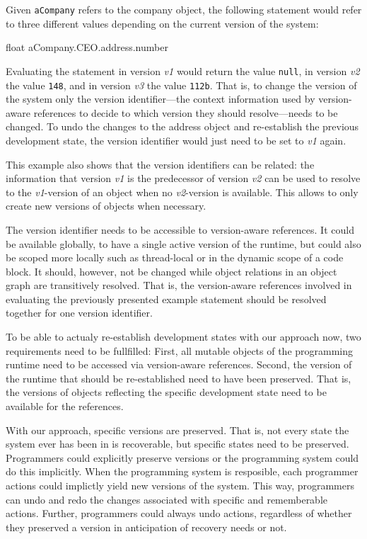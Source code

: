 Given \lstinline{aCompany} refers to the company object, the following statement would refer to three different values depending on the current version of the system:

\begin{code}{}{float}
aCompany.CEO.address.number
\end{code}
\iffalse
\end{verbatim}\fi

Evaluating the statement in version \emph{v1} would return the value \lstinline{null}, in version \emph{v2} the value \lstinline{148}, and in version \emph{v3} the value \lstinline{112b}.
That is, to change the version of the system only the version identifier---the context information used by version-aware references to decide to which version they should resolve---needs to be changed.
To undo the changes to the address object and re-establish the previous development state, the version identifier would just need to be set to \emph{v1} again.

This example also shows that the version identifiers can be related: the information that version \emph{v1} is the predecessor of version \emph{v2} can be used to resolve to the \emph{v1}-version of an object when no \emph{v2}-version is available.
This allows to only create new versions of objects when necessary.

The version identifier needs to be accessible to version-aware references.
It could be available globally, to have a single active version of the runtime, but could also be scoped more locally such as thread-local or in the dynamic scope of a code block.
It should, however, not be changed while object relations in an object graph are transitively resolved.
That is, the version-aware references involved in evaluating the previously presented example statement should be resolved together for one version identifier.

To be able to actualy re-establish development states with our approach now, two requirements need to be fullfilled:
First, all mutable objects of the programming runtime need to be accessed via version-aware references.
Second, the version of the runtime that should be re-established need to have been preserved.
That is, the versions of objects reflecting the specific development state need to be available for the references.

With our approach, specific versions are preserved.
That is, not every state the system ever has been in is recoverable, but specific states need to be preserved.
Programmers could explicitly preserve versions or the programming system could do this implicitly.
When the programming system is resposible, each programmer actions could implictly yield new versions of the system.
This way, programmers can undo and redo the changes associated with specific and rememberable actions.
Further, programmers could always undo actions, regardless of whether they preserved a version in anticipation of recovery needs or not.






